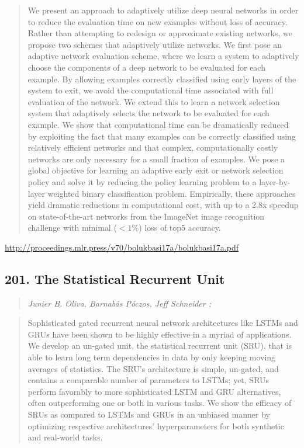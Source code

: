 \documentclass{article}
\begin{document}
\begin{quote}
    We present an approach to adaptively utilize deep neural networks in order to reduce the evaluation time on new examples without loss of accuracy. Rather than attempting to redesign or approximate existing networks, we propose two schemes that adaptively utilize networks. We first pose an adaptive network evaluation scheme, where we learn a system to adaptively choose the components of a deep network to be evaluated for each example. By allowing examples correctly classified using early layers of the system to exit, we avoid the computational time associated with full evaluation of the network. We extend this to learn a network selection system that adaptively selects the network to be evaluated for each example. We show that computational time can be dramatically reduced by exploiting the fact that many examples can be correctly classified using relatively efficient networks and that complex, computationally costly networks are only necessary for a small fraction of examples. We pose a global objective for learning an adaptive early exit or network selection policy and solve it by reducing the policy learning problem to a layer-by-layer weighted binary classification problem. Empirically, these approaches yield dramatic reductions in computational cost, with up to a 2.8x speedup on state-of-the-art networks from the ImageNet image recognition challenge with minimal ($<1\%$) loss of top5 accuracy.  \end{quote}

\href{http://proceedings.mlr.press/v70/bolukbasi17a/bolukbasi17a.pdf}{http://proceedings.mlr.press/v70/bolukbasi17a/bolukbasi17a.pdf}

\subsection{201. The Statistical Recurrent Unit}

\begin{quote}
\footnotesize{\textit{Junier B. Oliva, Barnabás Póczos, Jeff Schneider ;}}
\end{quote}

\begin{quote}
    Sophisticated gated recurrent neural network architectures like LSTMs and GRUs have been shown to be highly effective in a myriad of applications. We develop an un-gated unit, the statistical recurrent unit (SRU), that is able to learn long term dependencies in data by only keeping moving averages of statistics. The SRU’s architecture is simple, un-gated, and contains a comparable number of parameters to LSTMs; yet, SRUs perform favorably to more sophisticated LSTM and GRU alternatives, often outperforming one or both in various tasks. We show the efficacy of SRUs as compared to LSTMs and GRUs in an unbiased manner by optimizing respective architectures’ hyperparameters for both synthetic and real-world tasks.  \end{quote}
\end{document}
